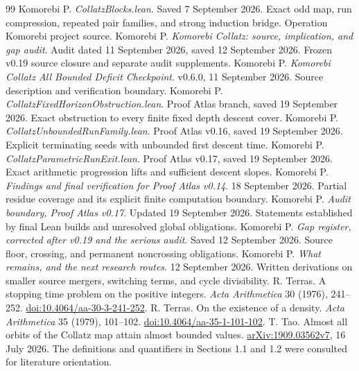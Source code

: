 \begin{thebibliography}{99}
 Komorebi P. \emph{CollatzBlocks.lean}. Saved 7 September 2026. Exact odd map, run compression, repeated pair families, and strong induction bridge. Operation Komorebi project source.
 Komorebi P. \emph{Komorebi Collatz: source, implication, and gap audit}. Audit dated 11 September 2026, saved 12 September 2026. Frozen v0.19 source closure and separate audit supplements.
 Komorebi P. \emph{Komorebi Collatz All Bounded Deficit Checkpoint}. v0.6.0, 11 September 2026. Source description and verification boundary.
 Komorebi P. \emph{CollatzFixedHorizonObstruction.lean}. Proof Atlas branch, saved 19 September 2026. Exact obstruction to every finite fixed depth descent cover.
 Komorebi P. \emph{CollatzUnboundedRunFamily.lean}. Proof Atlas v0.16, saved 19 September 2026. Explicit terminating seeds with unbounded first descent time.
 Komorebi P. \emph{CollatzParametricRunExit.lean}. Proof Atlas v0.17, saved 19 September 2026. Exact arithmetic progression lifts and sufficient descent slopes.
 Komorebi P. \emph{Findings and final verification for Proof Atlas v0.14}. 18 September 2026. Partial residue coverage and its explicit finite computation boundary.
 Komorebi P. \emph{Audit boundary, Proof Atlas v0.17}. Updated 19 September 2026. Statements established by final Lean builds and unresolved global obligations.
 Komorebi P. \emph{Gap register, corrected after v0.19 and the serious audit}. Saved 12 September 2026. Source floor, crossing, and permanent noncrossing obligations.
 Komorebi P. \emph{What remains, and the next research routes}. 12 September 2026. Written derivations on smaller source mergers, switching terms, and cycle divisibility.
 R. Terras. A stopping time problem on the positive integers. \emph{Acta Arithmetica} 30 (1976), 241--252. \href{https://doi.org/10.4064/aa-30-3-241-252}{doi:10.4064/aa-30-3-241-252}.
 R. Terras. On the existence of a density. \emph{Acta Arithmetica} 35 (1979), 101--102. \href{https://doi.org/10.4064/aa-35-1-101-102}{doi:10.4064/aa-35-1-101-102}.
 T. Tao. Almost all orbits of the Collatz map attain almost bounded values. \href{https://arxiv.org/html/1909.03562v7}{arXiv:1909.03562v7}, 16 July 2026. The definitions and quantifiers in Sections 1.1 and 1.2 were consulted for literature orientation.
\end{thebibliography}
